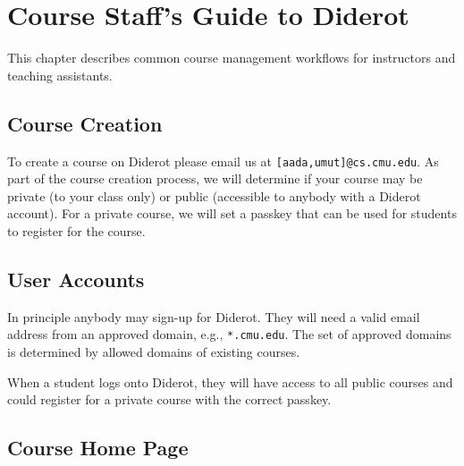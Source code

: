 \chapter{Course Staff's Guide to Diderot}
\label{ch:guide}

\begin{preamble}
This chapter describes common course management workflows for instructors and teaching assistants.
\end{preamble}

\section{Course Creation}

To create a course on Diderot please email us at \lstinline`[aada,umut]@cs.cmu.edu`.
%
As part of the course creation process, we will determine if your course may be private (to your class only) or public (accessible to anybody with a Diderot account).
%
For a private course, we will set a passkey that can be used for students to register for the course.

\section{User Accounts}
In principle anybody may sign-up for Diderot.  
%
They will need a valid email address from an approved domain, e.g.,
\lstinline`*.cmu.edu`.
%
The set of approved domains is determined by allowed domains of existing courses.
%

When a student logs onto Diderot, they will have access to all public
courses and could register for a private course with the correct
passkey.
%


\section{Course Home Page}

